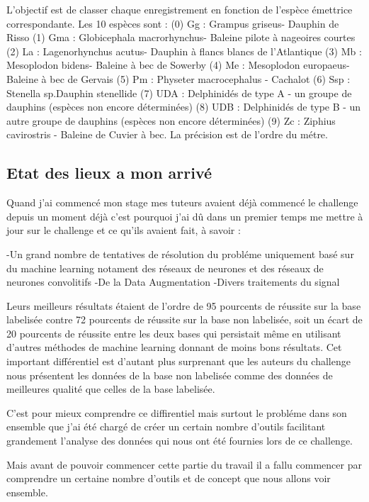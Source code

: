 L'objectif est de classer chaque enregistrement en fonction de l'espèce émettrice correspondante. Les 10 espèces sont : (0) Gg : Grampus griseus- Dauphin de Risso (1) Gma : Globicephala macrorhynchus- Baleine pilote à nageoires courtes (2) La : Lagenorhynchus acutus- Dauphin à flancs blancs de l'Atlantique (3) Mb : Mesoplodon bidens- Baleine à bec de Sowerby (4) Me : Mesoplodon europaeus- Baleine à bec de Gervais (5) Pm : Physeter macrocephalus - Cachalot (6) Ssp : Stenella sp.Dauphin stenellide (7) UDA : Delphinidés de type A - un groupe de dauphins (espèces non encore déterminées) (8) UDB : Delphinidés de type B - un autre groupe de dauphins (espèces non encore déterminées) (9) Zc : Ziphius cavirostris - Baleine de Cuvier à bec. La précision est de l'ordre du métre.


\hypertarget{Etat-des-lieux-lors-de-mon-arrivuxe9}{%
\subsection{Etat des lieux a mon arrivé}
\label{Etat-des-lieux-lors-de-mon-arrivuxe9}}

Quand j'ai commencé mon stage mes tuteurs avaient déjà commencé le challenge depuis un moment déjà c'est pourquoi j'ai dû dans un premier temps me mettre à jour sur le challenge et ce qu'ils avaient fait, à savoir :

-Un grand nombre de tentatives de résolution du probléme uniquement basé sur du machine learning notament des réseaux de neurones et des réseaux de neurones convolitifs
-De la Data Augmentation
-Divers traitements du signal

Leurs meilleurs résultats étaient de l'ordre de 95 pourcents de réussite sur la base labelisée contre 72 pourcents de réussite sur la base non labelisée, soit un écart de 20 pourcents de réussite entre les deux bases qui persistait même en utilisant d'autres méthodes de machine learning donnant de moins bons résultats.
Cet important différentiel est d'autant plus surprenant que les auteurs du challenge nous présentent les données de la base non labelisée comme des données de meilleures qualité que celles de la base labelisée.

C'est pour mieux comprendre ce diffirentiel mais surtout le probléme dans son ensemble que j'ai été chargé de créer un certain nombre d'outils facilitant grandement l'analyse des données qui nous ont été fournies lors de ce challenge.

Mais avant de pouvoir commencer cette partie du travail il a fallu commencer par comprendre un certaine nombre d'outils et de concept que nous allons voir ensemble.


